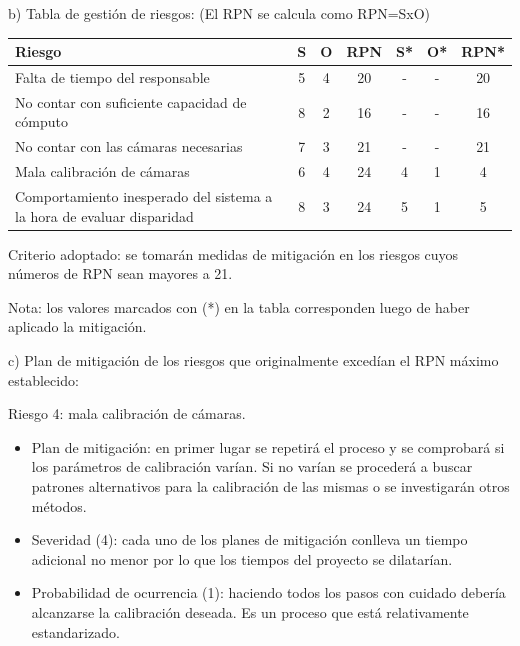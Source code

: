 \documentclass[
11pt, %
]{charter}
\begin{document}
b) Tabla de gestión de riesgos:      (El RPN se calcula como RPN=SxO)

\begin{table}[htpb]
\centering
\begin{tabularx}{\linewidth}{@{}|X|c|c|c|c|c|c|@{}}
\hline
\rowcolor[HTML]{C0C0C0} 
Riesgo & S & O & RPN & S* & O* & RPN* \\ \hline
       Falta de tiempo del responsable & 5  & 4  & 20 & - & - & 20 \\ \hline
       No contar con suficiente capacidad de cómputo & 8  & 2  & 16 & - & - & 16     \\ \hline
       No contar con las cámaras necesarias & 7  & 3 & 21 &  -  &  -  &  21    \\ \hline
       Mala calibración de cámaras & 6 & 4 & 24 & 4 & 1 & 4     \\ \hline
      Comportamiento inesperado del sistema a la hora de evaluar disparidad & 8 & 3 & 24 & 5  & 1   & 5  \\ \hline
\end{tabularx}
\end{table}

Criterio adoptado: se tomarán medidas de mitigación en los riesgos cuyos números de RPN sean mayores a 21.

Nota: los valores marcados con (*) en la tabla corresponden luego de haber aplicado la mitigación.


c) Plan de mitigación de los riesgos que originalmente excedían el RPN máximo establecido:
 
Riesgo 4: mala calibración de cámaras.
\begin{itemize}
	\item Plan de mitigación: en primer lugar se repetirá el proceso y se comprobará si los parámetros de calibración varían. Si no varían se procederá a buscar patrones alternativos para la calibración de las mismas o se investigarán otros métodos.
	\item Severidad (4): cada uno de los planes de mitigación conlleva un tiempo adicional no menor por lo que los tiempos del proyecto se dilatarían.
	\item Probabilidad de ocurrencia (1): haciendo todos los pasos con cuidado debería alcanzarse la calibración deseada. Es un proceso que está relativamente estandarizado.
\end{itemize}
\end{document}
